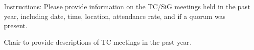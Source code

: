 Instructions: Please provide information on the TC/SiG meetings held in the past year, including date, time, location, attendance rate, and if a quorum was present.

Chair to provide descriptions of TC meetings in the past year.

